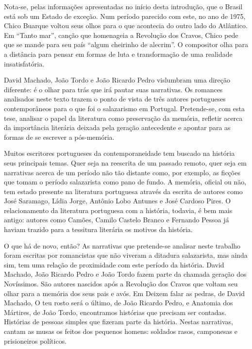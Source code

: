\documentclass[../DISSERTACAO_MAIN.tex]{subfiles}
\begin{document}
Nota-se, pelas informações apresentadas no início desta introdução, que o Brasil está sob um Estado de exceção. Num período parecido com este, no ano de 1975, Chico Buarque voltou seus olhos para o que acontecia do outro lado do Atlântico. Em “Tanto mar”, canção que homenageia a Revolução dos Cravos, Chico pede que se mande para seu país “algum cheirinho de alecrim”. O compositor olha para a distância para pensar em formas de luta e transformação de uma realidade insatisfatória.

David Machado, João Tordo e João Ricardo Pedro vislumbram uma direção diferente: é o olhar para trás que irá pautar suas narrativas. Os romances analisados neste texto trazem o ponto de vista de três autores portugueses contemporâneos para o que foi o salazarismo em Portugal. Pretende-se, com esta tese, analisar o papel da literatura como preservação da memória, refletir acerca da importância  literária deixada pela geração antecedente e apontar para as formas de se escrever a pós-memória.

Muitos escritores portugueses da contemporaneidade tem buscado na história seus principais temas. Quer seja na reescrita de um passado remoto, quer seja em narrativas acerca de um período não tão distante como, por exemplo, as ficções que tomam o período salazarista como pano de fundo. A memória, oficial ou não, tem estado presente na literatura portuguesa através da escrita de autores como José Saramago, Lídia Jorge, Antônio Lobo Antunes e José Cardoso Pires. O relacionamento da literatura portuguesa com a história, todavia, é bem mais antigo: autores como Camões, Camilo Castelo Branco e Fernando Pessoa já haviam trazido para a tessitura literária os motivos da história.

O que há de novo, então? As narrativas que pretende-se analisar neste trabalho foram escritas por romancistas que não viveram a ditadura salazarista, mas ainda sim, tem uma relação de proximidade com este período da história. David Machado, João Ricardo Pedro e João Tordo fazem parte da chamada geração dos Novíssimos. São autores nascidos após a Revolução dos Cravos que voltam seu olhar para a memória dos seus pais e avós. Em Deixem falar as pedras, de David Machado, O teu rosto será o último, de João Ricardo Pedro, e Anatomia dos Mártires, de João Tordo, encontramos histórias que precisam ser contadas. Histórias de pessoas simples que fizeram parte da história. Nestas narrativas, cantam as musas os feitos dos pequenos homens: soldados rasos, camponesas e prisioneiros políticos.
\end{document}
